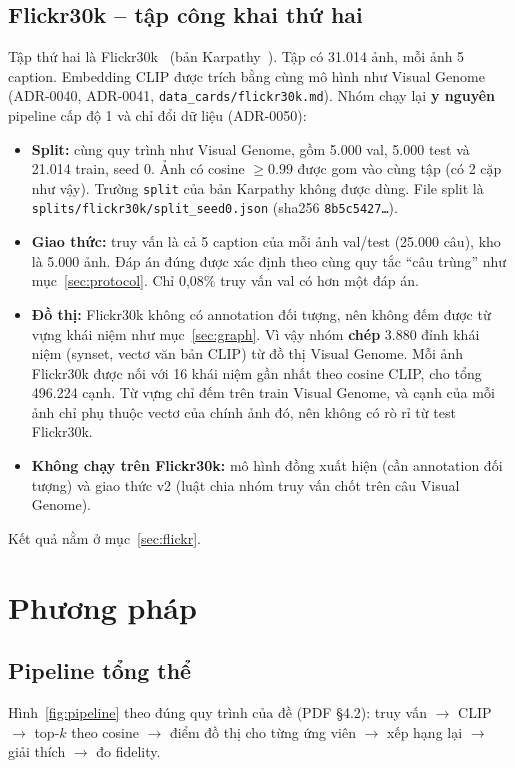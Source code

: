\documentclass[12pt, a4paper]{article}
\newcommand{\code}[1]{\texttt{#1}}
\begin{document}
\subsection{Flickr30k -- tập công khai thứ hai}
Tập thứ hai là Flickr30k~\cite{young2014flickr} (bản Karpathy~\cite{karpathy2015}). Tập có 31.014 ảnh, mỗi ảnh 5 caption. Embedding CLIP được trích bằng cùng mô hình như Visual Genome (ADR-0040, ADR-0041, \code{data\_cards/flickr30k.md}). Nhóm chạy lại \textbf{y nguyên} pipeline cấp độ 1 và chỉ đổi dữ liệu (ADR-0050):
\begin{itemize}
\item \textbf{Split:} cùng quy trình như Visual Genome, gồm 5.000 val, 5.000 test và 21.014 train, seed 0. Ảnh có cosine $\ge 0.99$ được gom vào cùng tập (có 2 cặp như vậy). Trường \code{split} của bản Karpathy không được dùng. File split là \code{splits/flickr30k/split\_seed0.json} (sha256 \code{8b5c5427\dots}).
\item \textbf{Giao thức:} truy vấn là cả 5 caption của mỗi ảnh val/test (25.000 câu), kho là 5.000 ảnh. Đáp án đúng được xác định theo cùng quy tắc ``câu trùng'' như mục~\ref{sec:protocol}. Chỉ 0,08\% truy vấn val có hơn một đáp án.
\item \textbf{Đồ thị:} Flickr30k không có annotation đối tượng, nên không đếm được từ vựng khái niệm như mục~\ref{sec:graph}. Vì vậy nhóm \textbf{chép} 3.880 đỉnh khái niệm (synset, vectơ văn bản CLIP) từ đồ thị Visual Genome. Mỗi ảnh Flickr30k được nối với 16 khái niệm gần nhất theo cosine CLIP, cho tổng 496.224 cạnh. Từ vựng chỉ đếm trên train Visual Genome, và cạnh của mỗi ảnh chỉ phụ thuộc vectơ của chính ảnh đó, nên không có rò rỉ từ test Flickr30k.
\item \textbf{Không chạy trên Flickr30k:} mô hình đồng xuất hiện (cần annotation đối tượng) và giao thức v2 (luật chia nhóm truy vấn chốt trên câu Visual Genome).
\end{itemize}
Kết quả nằm ở mục~\ref{sec:flickr}.

\section{Phương pháp}
\label{sec:method}

\subsection{Pipeline tổng thể}
Hình~\ref{fig:pipeline} theo đúng quy trình của đề (PDF §4.2): truy vấn $\to$ CLIP $\to$ top-$k$ theo cosine $\to$ điểm đồ thị cho từng ứng viên $\to$ xếp hạng lại $\to$ giải thích $\to$ đo fidelity.
\end{document}

